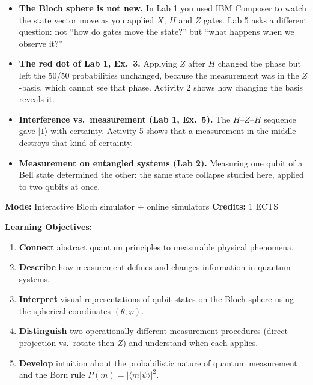 \documentclass[a4paper,11pt]{article}
\newcommand{\keepspace}[1]{\par\vspace{0pt plus #1}\penalty-300\vspace{0pt plus -#1}}
\providecommand{\ket}[1]{|{#1}\rangle}
\providecommand{\braket}[2]{\langle{#1}|{#2}\rangle}
\begin{document}
\begin{connectionbox}
\begin{itemize}
    \item \textbf{The Bloch sphere is not new.} In Lab 1 you used IBM Composer to watch the
          state vector move as you applied $X$, $H$ and $Z$ gates. Lab 5 asks a different question: not
          ``how do gates move the state?'' but ``what happens when we observe it?''
    \item \textbf{The red dot of Lab 1, Ex.\ 3.} Applying $Z$ after $H$ changed the phase
          but left the 50/50 probabilities unchanged, because the measurement was in the
          $Z$-basis, which cannot see that phase. Activity 2 shows how changing the basis
          reveals it.
    \item \textbf{Interference vs.\ measurement (Lab 1, Ex.\ 5).} The $H$--$Z$--$H$
          sequence gave $\ket{1}$ with certainty. Activity 5 shows that a measurement in
          the middle destroys that kind of certainty.
    \item \textbf{Measurement on entangled systems (Lab 2).} Measuring one qubit of a
          Bell state determined the other: the same state collapse studied here, applied
          to two qubits at once.
\end{itemize}
\end{connectionbox}

\noindent\textbf{Mode:} Interactive Bloch simulator + online simulators
\quad\textbf{Credits:} 1 ECTS

\keepspace{8\baselineskip}
\vspace{0.3cm}
\noindent\textbf{Learning Objectives:}\nopagebreak
\begin{enumerate}
    \item \textbf{Connect} abstract quantum principles to measurable physical phenomena.
    \item \textbf{Describe} how measurement defines and changes information in quantum
          systems.
    \item \textbf{Interpret} visual representations of qubit states on the Bloch sphere
          using the spherical coordinates $(\theta, \varphi)$.
    \item \textbf{Distinguish} two operationally different measurement procedures (direct
          projection vs.\ rotate-then-$Z$) and understand when each applies.
    \item \textbf{Develop} intuition about the probabilistic nature of quantum measurement
          and the Born rule $P(m) = |\braket{m}{\psi}|^2$.
\end{enumerate}
\end{document}
